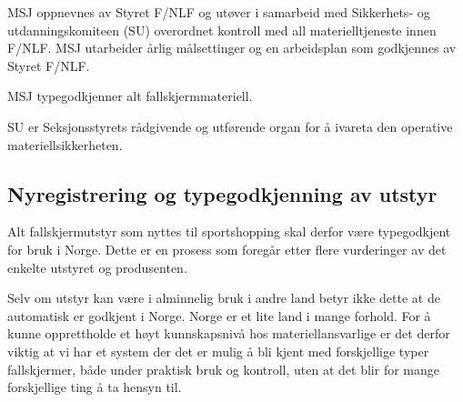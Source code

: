 MSJ oppnevnes av Styret F/NLF og utøver i samarbeid med Sikkerhets- og utdanningskomiteen (SU) overordnet kontroll med all materielltjeneste innen F/NLF. MSJ utarbeider årlig målsettinger og en arbeidsplan som godkjennes av Styret F/NLF.

MSJ typegodkjenner alt fallskjermmateriell.

SU er Seksjonsstyrets rådgivende og utførende organ for å ivareta den operative materiellsikkerheten.

\subsection{Nyregistrering og typegodkjenning av utstyr}
Alt fallskjermutstyr som nyttes til sportshopping skal derfor være typegodkjent for bruk i Norge. Dette er en prosess som foregår etter flere vurderinger av det enkelte utstyret og produsenten.

Selv om utstyr kan være i alminnelig bruk i andre land betyr ikke dette at de automatisk er godkjent i Norge. Norge er et lite land i mange forhold. For å kunne opprettholde et høyt kunnskapsnivå hos materiellansvarlige er det derfor viktig at vi har et system der det er mulig å bli kjent med forskjellige typer fallskjermer, både under praktisk bruk og kontroll, uten at det blir for mange forskjellige ting å ta hensyn til.


